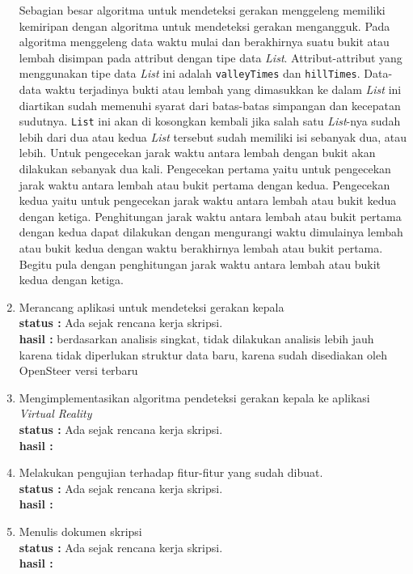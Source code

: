 \documentclass[a4paper,twoside]{article}
\begin{document}
\begin{enumerate}
Sebagian besar algoritma untuk mendeteksi gerakan menggeleng memiliki kemiripan dengan algoritma untuk mendeteksi gerakan mengangguk. Pada algoritma menggeleng data waktu mulai dan berakhirnya suatu bukit atau lembah disimpan pada attribut dengan tipe data \textit{List}. Attribut-attribut yang menggunakan tipe data \textit{List} ini adalah \texttt{valleyTimes} dan \texttt{hillTimes}. Data-data waktu terjadinya bukti atau lembah yang dimasukkan ke dalam \textit{List} ini diartikan sudah memenuhi syarat dari batas-batas simpangan dan kecepatan sudutnya. \texttt{List} ini akan di kosongkan kembali jika salah satu \textit{List}-nya sudah lebih dari dua atau kedua \textit{List} tersebut sudah memiliki isi sebanyak dua, atau lebih. 
Untuk pengecekan jarak waktu antara lembah dengan bukit akan dilakukan sebanyak dua kali. Pengecekan pertama yaitu untuk pengecekan jarak waktu antara lembah atau bukit pertama dengan kedua. Pengecekan kedua yaitu untuk pengecekan jarak waktu antara lembah atau bukit kedua dengan ketiga. Penghitungan jarak waktu antara lembah atau bukit pertama dengan kedua dapat dilakukan dengan mengurangi waktu dimulainya lembah atau bukit kedua dengan waktu berakhirnya lembah atau bukit pertama. Begitu pula dengan penghitungan jarak waktu antara lembah atau bukit kedua dengan ketiga.


		\item Merancang aplikasi untuk mendeteksi gerakan kepala\\
		{\bf status :} Ada sejak rencana kerja skripsi. \\
		{\bf hasil :} berdasarkan analisis singkat, tidak dilakukan analisis lebih jauh karena tidak diperlukan struktur data baru, karena sudah disediakan oleh OpenSteer versi terbaru

		\item Mengimplementasikan algoritma pendeteksi gerakan kepala ke aplikasi \textit{Virtual Reality}\\
		{\bf status :} Ada sejak rencana kerja skripsi.\\
		{\bf hasil :}

		\item Melakukan pengujian terhadap fitur-fitur yang sudah dibuat.\\
		{\bf status :} Ada sejak rencana kerja skripsi.\\
		{\bf hasil :}

		\item Menulis dokumen skripsi\\
		{\bf status :} Ada sejak rencana kerja skripsi.\\
		{\bf hasil :} 


\end{enumerate}
\end{document}
